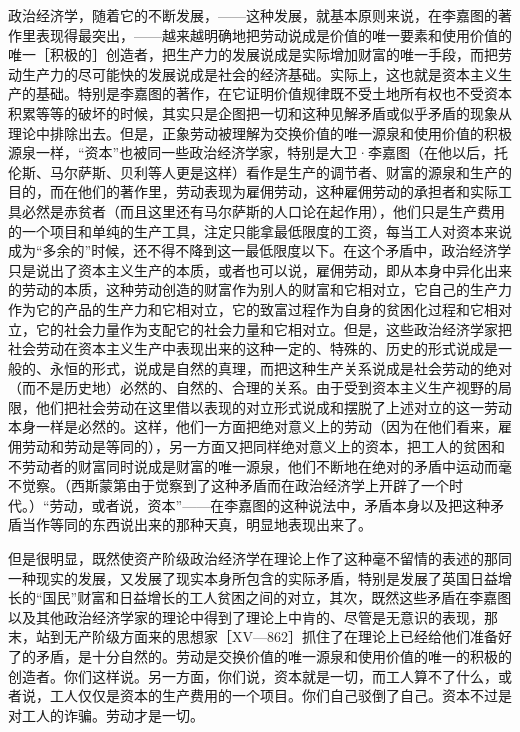 政治经济学，随着它的不断发展，——这种发展，就基本原则来说，在李嘉图的著作里表现得最突出，——越来越明确地把劳动说成是价值的唯一要素和使用价值的唯一［积极的］创造者，把生产力的发展说成是实际增加财富的唯一手段，而把劳动生产力的尽可能快的发展说成是社会的经济基础。实际上，这也就是资本主义生产的基础。特别是李嘉图的著作，在它证明价值规律既不受土地所有权也不受资本积累等等的破坏的时候，其实只是企图把一切和这种见解矛盾或似乎矛盾的现象从理论中排除出去。但是，正象劳动被理解为交换价值的唯一源泉和使用价值的积极源泉一样，“资本”也被同一些政治经济学家，特别是大卫·李嘉图（在他以后，托伦斯、马尔萨斯、贝利等人更是这样）看作是生产的调节者、财富的源泉和生产的目的，而在他们的著作里，劳动表现为雇佣劳动，这种雇佣劳动的承担者和实际工具必然是赤贫者（而且这里还有马尔萨斯的人口论在起作用），他们只是生产费用的一个项目和单纯的生产工具，注定只能拿最低限度的工资，每当工人对资本来说成为“多余的”时候，还不得不降到这一最低限度以下。在这个矛盾中，政治经济学只是说出了资本主义生产的本质，或者也可以说，雇佣劳动，即从本身中异化出来的劳动的本质，这种劳动创造的财富作为别人的财富和它相对立，它自己的生产力作为它的产品的生产力和它相对立，它的致富过程作为自身的贫困化过程和它相对立，它的社会力量作为支配它的社会力量和它相对立。但是，这些政治经济学家把社会劳动在资本主义生产中表现出来的这种一定的、特殊的、历史的形式说成是一般的、永恒的形式，说成是自然的真理，而把这种生产关系说成是社会劳动的绝对（而不是历史地）必然的、自然的、合理的关系。由于受到资本主义生产视野的局限，他们把社会劳动在这里借以表现的对立形式说成和摆脱了上述对立的这一劳动本身一样是必然的。这样，他们一方面把绝对意义上的劳动（因为在他们看来，雇佣劳动和劳动是等同的），另一方面又把同样绝对意义上的资本，把工人的贫困和不劳动者的财富同时说成是财富的唯一源泉，他们不断地在绝对的矛盾中运动而毫不觉察。（西斯蒙第由于觉察到了这种矛盾而在政治经济学上开辟了一个时代。）“劳动，或者说，资本”——在李嘉图的这种说法中，矛盾本身以及把这种矛盾当作等同的东西说出来的那种天真，明显地表现出来了。

但是很明显，既然使资产阶级政治经济学在理论上作了这种毫不留情的表述的那同一种现实的发展，又发展了现实本身所包含的实际矛盾，特别是发展了英国日益增长的“国民”财富和日益增长的工人贫困之间的对立，其次，既然这些矛盾在李嘉图以及其他政治经济学家的理论中得到了理论上中肯的、尽管是无意识的表现，那末，站到无产阶级方面来的思想家［XV—862］抓住了在理论上已经给他们准备好了的矛盾，是十分自然的。劳动是交换价值的唯一源泉和使用价值的唯一的积极的创造者。你们这样说。另一方面，你们说，资本就是一切，而工人算不了什么，或者说，工人仅仅是资本的生产费用的一个项目。你们自己驳倒了自己。资本不过是对工人的诈骗。劳动才是一切。

